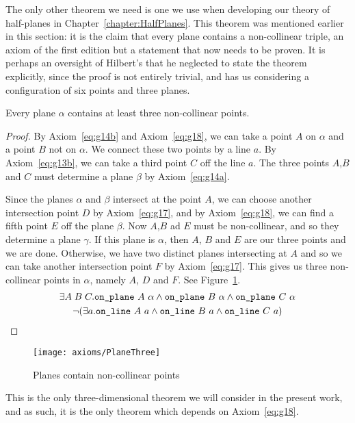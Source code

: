 The only other theorem we need is one we use when developing our theory of half-planes in Chapter~\ref{chapter:HalfPlanes}. This theorem was mentioned earlier in this section: it is the claim that every plane contains a non-collinear triple, an axiom of the first edition but a statement that now needs to be proven. It is perhaps an oversight of Hilbert's that he neglected to state the theorem explicitly, since the proof is not entirely trivial, and has us considering a configuration of six points and three planes.

\label{sec:PlaneThree}
\begin{theorem}\label{eq:PlaneThree}
Every plane $\alpha$ contains at least three non-collinear points.
\end{theorem}
\begin{proof}
By Axiom~\ref{eq:g14b} and Axiom~\ref{eq:g18}, we can take a point $A$ on $\alpha$ and a point $B$ not on $\alpha$. We connect these two points by a line $a$. By Axiom~\ref{eq:g13b}, we can take a third point $C$ off the line $a$. The three points $A$,$B$ and $C$ must determine a plane $\beta$ by Axiom~\ref{eq:g14a}.

Since the planes $\alpha$ and $\beta$ intersect at the point $A$, we can choose another intersection point $D$ by Axiom~\ref{eq:g17}, and by Axiom~\ref{eq:g18}, we can find a fifth point $E$ off the plane $\beta$. Now $A$,$B$ ad $E$ must be non-collinear, and so they determine a plane $\gamma$. If this plane is $\alpha$, then $A$, $B$ and $E$ are our three points and we are done. Otherwise, we have two distinct planes intersecting at $A$ and so we can take another intersection point $F$ by Axiom~\ref{eq:g17}. This gives us three non-collinear points in $\alpha$, namely $A$, $D$ and $F$. See Figure~\ref{fig:PlaneThree}.
\begin{multline}
\exists A\;B\;C. \code{on\_plane}\ A\ \alpha \wedge \code{on\_plane}\ B\ \alpha \wedge \code{on\_plane}\ C\ \alpha\\
\Triangle{a}{A}{B}{C}
\end{multline}
\end{proof}
\begin{figure}
\centering\texttt{[image: axioms/PlaneThree]}
\caption{Planes contain non-collinear points}
\label{fig:PlaneThree}
\end{figure}

This is the only three-dimensional theorem we will consider in the present work, and as such, it is the only theorem which depends on Axiom~\ref{eq:g18}.

